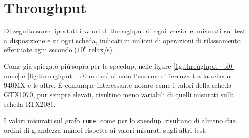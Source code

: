 \documentclass[12pt,a4paper,oneside]{book}
\begin{document}
	\section{Throughput}
	Di seguito sono riportati i valori di throughput di ogni versione, misurati sui test a disposizione e su ogni scheda, indicati in milioni di operazioni di rilassamento effettuate ogni secondo ($10^6$ relax/s).
	
	Come già spiegato più sopra per lo speedup, nelle figure \ref{fig:throughput_bf0-none} e \ref{fig:throughput_bf0-mutex} si nota l'enorme differenza tra la scheda 940MX e le altre. \'E comunque interessante notare come i valori della scheda GTX1070, pur sempre elevati, risultino meno variabili di quelli misurati sulla scheda RTX2080.
	
	I valori misurati sul grafo \texttt{rome}, come per lo speedup, risultano di almeno due ordini di grandezza minori rispetto ai valori misurati sugli altri test.
	
\end{document}
